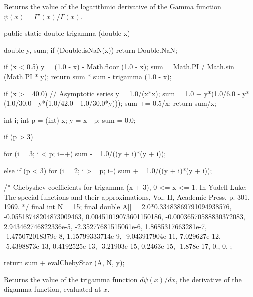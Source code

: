 \begin{tabb}
   Returns the value of the logarithmic derivative of the Gamma function
   $\psi(x) = \Gamma'(x) / \Gamma(x)$.
\end{tabb}
\begin{code}

   public static double trigamma (double x)\begin{hide} {
      double y, sum;
      if (Double.isNaN(x))
         return Double.NaN;

      if (x < 0.5) {
         y = (1.0 - x) - Math.floor (1.0 - x);
         sum = Math.PI / Math.sin (Math.PI * y);
         return  sum * sum - trigamma (1.0 - x);
      }

      if (x >= 40.0) {
         // Asymptotic series
         y = 1.0/(x*x);
         sum = 1.0 + y*(1.0/6.0 - y*(1.0/30.0 - y*(1.0/42.0 - 1.0/30.0*y)));
         sum += 0.5/x;
         return sum/x;
      }

      int i;
      int p = (int) x;
      y = x - p;
      sum = 0.0;

      if (p > 3) {
         for (i = 3; i < p; i++)
            sum -= 1.0/((y + i)*(y + i));

      } else if (p < 3) {
         for (i = 2; i >= p; i--)
            sum += 1.0/((y + i)*(y + i));
      }

      /* Chebyshev coefficients for trigamma (x + 3), 0 <= x <= 1. In Yudell
         Luke: The special functions and their approximations, Vol. II,
         Academic Press, p. 301, 1969. */
      final int N = 15;
      final double A[] = { 2.0*0.33483869791094938576, -0.05518748204873009463,
         0.00451019073601150186, -0.00036570588830372083,
         2.943462746822336e-5, -2.35277681515061e-6, 1.8685317663281e-7,
         -1.475072018379e-8, 1.15799333714e-9, -9.043917904e-11,
         7.029627e-12, -5.4398873e-13, 0.4192525e-13, -3.21903e-15, 0.2463e-15,
        -1.878e-17, 0., 0. };

      return sum + evalChebyStar (A, N, y);
   }\end{hide}
\end{code}
\begin{tabb}
   Returns the value of the trigamma function $d\psi(x)/dx$, the derivative of
   the digamma function, evaluated at $x$.
\end{tabb}
